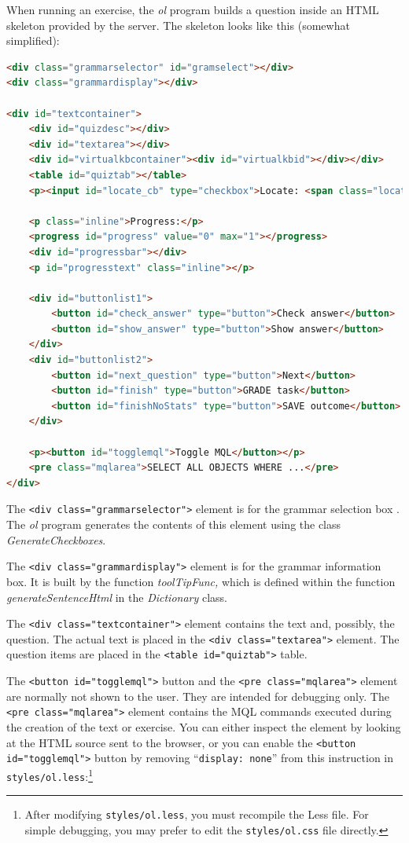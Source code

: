 \documentclass[11pt,oneside,a4paper]{memoir}
\newcommand*{\xml}[1]{\texttt{<#1>}}
\begin{document}
When running an exercise, the \emph{ol} program builds a question inside an HTML skeleton provided by the
server. The skeleton looks like this (somewhat simplified):

\begin{lstlisting}[language=HTML,morekeywords={progress}]
<div class="grammarselector" id="gramselect"></div>
<div class="grammardisplay"></div>
 
<div id="textcontainer">
    <div id="quizdesc"></div>
    <div id="textarea"></div>
    <div id="virtualkbcontainer"><div id="virtualkbid"></div></div>
    <table id="quiztab"></table>
    <p><input id="locate_cb" type="checkbox">Locate: <span class="location"></span></p>

    <p class="inline">Progress:</p>
    <progress id="progress" value="0" max="1"></progress>
    <div id="progressbar"></div>
    <p id="progresstext" class="inline"></p>

    <div id="buttonlist1">
        <button id="check_answer" type="button">Check answer</button>
        <button id="show_answer" type="button">Show answer</button>
    </div>
    <div id="buttonlist2">
        <button id="next_question" type="button">Next</button>
        <button id="finish" type="button">GRADE task</button>
        <button id="finishNoStats" type="button">SAVE outcome</button>
    </div>

    <p><button id="togglemql">Toggle MQL</button></p>
    <pre class="mqlarea">SELECT ALL OBJECTS WHERE ...</pre>
</div>
\end{lstlisting}
  
The \xml{div class="grammarselector"} element is for the grammar selection box%
.
The \emph{ol} program generates the contents of this element using the class
\emph{GenerateCheckboxes}.

The \xml{div class="grammardisplay"} element is for the grammar information box.%
It is built by the function \emph{toolTipFunc,} which is defined within the function
\emph{generateSentenceHtml} in the \emph{Dictionary} class.

The \xml{div class="textcontainer"} element contains the text and, possibly, the question. The
actual text is placed in the \xml{div class="textarea"} element. The question items are placed
in the \xml{table id="quiztab"} table.

The \xml{button id="togglemql"} button and the \xml{pre class="mqlarea"} element are normally not
shown to the user. They are intended for debugging only. The \xml{pre class="mqlarea"} element
contains the MQL commands executed during the creation of the text
or exercise. You can either inspect the element by looking at the HTML source sent to the browser,
or you can enable the \xml{button id="togglemql"} button by removing ``\texttt{display:~none}'' from
this instruction in \texttt{styles/ol.less}:\footnote{After modifying \texttt{styles/ol.less}, you
  must recompile the Less file. For simple debugging, you may prefer to edit the
  \texttt{styles/ol.css} file directly.}
\end{document}
